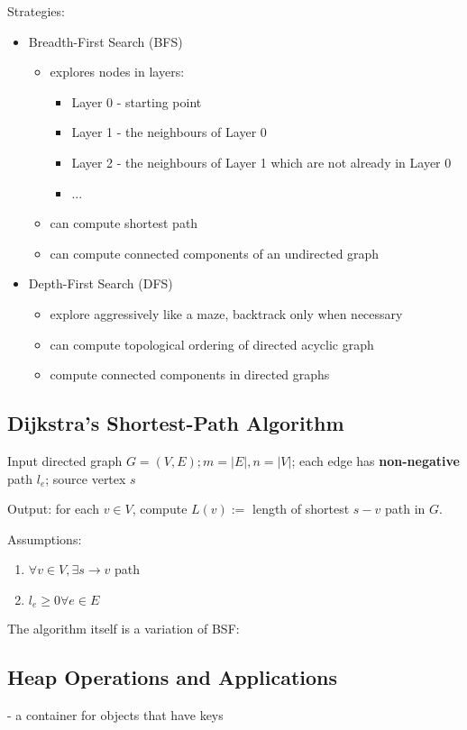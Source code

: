 \documentclass{scrartcl}
\begin{document}
Strategies:
\begin{itemize}
\item Breadth-First Search (BFS)
  \begin{itemize}
  \item explores nodes in layers:
    \begin{itemize}
    \item Layer 0 - starting point
    \item Layer 1 - the neighbours of Layer 0
    \item Layer 2 - the neighbours of Layer 1 which are not already in Layer 0
    \item ...
    \end{itemize}
  \item can compute shortest path
  \item can compute connected components of an undirected graph
  \end{itemize}
\item Depth-First Search (DFS)
  \begin{itemize}
  \item explore aggressively like a maze, backtrack only when necessary
  \item can compute topological ordering of directed acyclic graph
  \item compute connected components in directed graphs
  \end{itemize}
\end{itemize}

\subsection{Dijkstra's Shortest-Path Algorithm}
\label{sec:Dijkstra}
Input directed graph $G = (V, E); m = |E|, n = |V|$; each edge has {\bf
  non-negative} path $l_e$; source vertex $s$

Output: for each $v \in V$, compute $L(v) :=$ length of shortest $s-v$ path in
$G$.

Assumptions:
\begin{enumerate}
\item $\forall v \in V, \exists s \rightarrow v$ path
\item $l_e \ge 0 \forall e \in E$
\end{enumerate}
The algorithm itself is a variation of BSF:

\subsection{Heap Operations and Applications}
\label{sec:DataHeap}
- a container for objects that have keys
\end{document}
